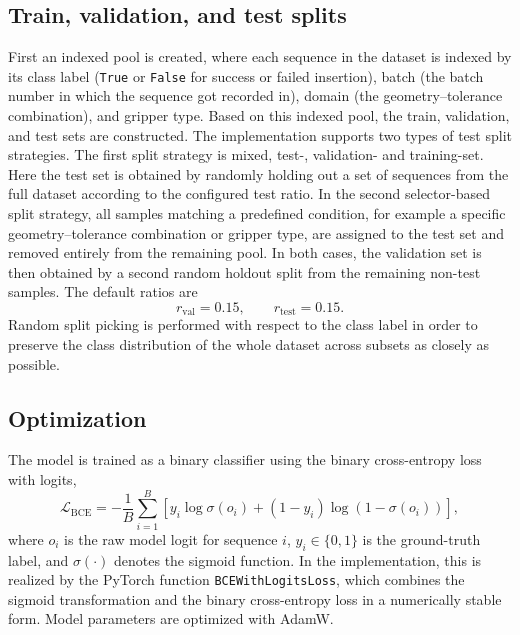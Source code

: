 \subsection{Train, validation, and test splits} \label{subsec:train_val_test_splits}
First an indexed pool is created, where each sequence in the dataset is indexed by its class label (\texttt{True} or \texttt{False} for success or failed insertion), batch (the batch number in which the sequence got recorded in), domain (the geometry--tolerance combination), and gripper type. Based on this indexed pool, the train, validation, and test sets are constructed. The implementation supports two types of test split strategies. The first split strategy is mixed, test-, validation- and training-set. Here the test set is obtained by randomly holding out a set of sequences from the full dataset according to the configured test ratio. In the second selector-based split strategy, all samples matching a predefined condition, for example a specific geometry--tolerance combination or gripper type, are assigned to the test set and removed entirely from the remaining pool. In both cases, the validation set is then obtained by a second random holdout split from the remaining non-test samples. The default ratios are
\begin{equation}
r_{\mathrm{val}} = 0.15,
\qquad
r_{\mathrm{test}} = 0.15.
\end{equation}
Random split picking is performed with respect to the class label in order to preserve the class distribution of the whole dataset across subsets as closely as possible.

\subsection{Optimization}
The model is trained as a binary classifier using the binary cross-entropy loss with logits,
\begin{equation}
\mathcal{L}_{\mathrm{BCE}} =
-\frac{1}{B}\sum_{i=1}^{B}
\left[
y_i \log \sigma(o_i)
+
(1-y_i)\log\left(1-\sigma(o_i)\right)
\right],
\end{equation}
where $o_i$ is the raw model logit for sequence $i$, $y_i \in \{0,1\}$ is the ground-truth label, and $\sigma(\cdot)$ denotes the sigmoid function. In the implementation, this is realized by the PyTorch function \texttt{BCEWithLogitsLoss}, which combines the sigmoid transformation and the binary cross-entropy loss in a numerically stable form\cite{BCEWithLogitsLossPyTorch211}. Model parameters are optimized with AdamW.

